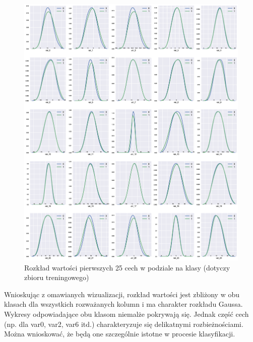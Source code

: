 \documentclass[12pt]{article}
\begin{document}
\begin{figure}[H]
\centering 
\includegraphics[width = 472pt]{feature_distribution.eps}
\caption{Rozkład wartości pierwszych 25 cech w podziale na klasy (dotyczy zbioru treningowego)}
\label{featuresDistribution25}
\end{figure}

Wnioskując z omawianych wizualizacji, rozkład wartości jest zbliżony w obu klasach dla wszystkich rozważanych kolumn i ma charakter rozkładu Gaussa. Wykresy odpowiadające obu klasom niemalże pokrywają się. Jednak część cech (np. dla var0, var2, var6 itd.) charakteryzuje się delikatnymi rozbieżnościami. Można wnioskować, że będą one szczególnie istotne w procesie klasyfikacji.
\end{document}
